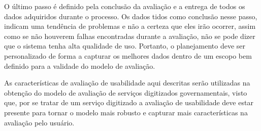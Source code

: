 O último passo é definido pela conclusão da avaliação e a entrega de todos os dados adquiridos durante o processo. Os dados tidos como conclusão nesse passo, indicam uma tendência de problemas e não a certeza que eles irão ocorrer, assim como se não houverem falhas encontradas durante a avaliação, não se pode dizer que o sistema tenha alta qualidade de uso. Portanto, o planejamento deve ser personalizado de forma a capturar os melhores dados dentro de um escopo bem definido para a validade do modelo de avaliação.

As características de avaliação de usabilidade aqui descritas serão utilizadas na obtenção do modelo de avaliação de serviços digitizados governamentais, visto que, por se tratar de um serviço digitizado a avaliação de usabilidade deve estar presente para tornar o modelo mais robusto e capturar mais características na avaliação pelo usuário.
